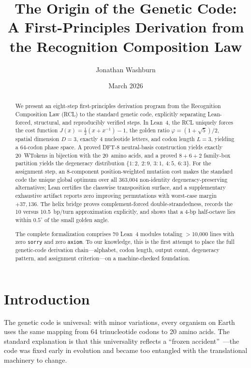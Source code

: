\documentclass[11pt,twocolumn]{article}
\title{The Origin of the Genetic Code:\\A First-Principles Derivation from\\the Recognition Composition Law}
\author[1]{Jonathan Washburn}
\affil[1]{Independent Researcher}
\date{March 2026}
\newcommand{\vp}{\varphi}
\begin{document}
\maketitle

\begin{abstract}
We present an eight-step first-principles derivation program from the
Recognition Composition Law (RCL) to the standard genetic code, explicitly
separating Lean-forced, structural, and reproducibly verified steps. In
Lean~4, the RCL uniquely forces the cost function
$J(x) = \tfrac{1}{2}(x + x^{-1}) - 1$, the golden ratio
$\vp = (1+\sqrt{5})/2$, spatial dimension $D = 3$, exactly 4 nucleotide
letters, and codon length $L = 3$, yielding a 64-codon phase space. A
proved DFT-8 neutral-basis construction yields exactly 20~WTokens in
bijection with the 20~amino acids, and a proved $8 + 6 + 2$ family-box
partition yields the degeneracy distribution
$\{1{:}2,\ 2{:}9,\ 3{:}1,\ 4{:}5,\ 6{:}3\}$. For the assignment step, an
8-component position-weighted mutation cost makes the standard code the
unique global optimum over all 363,004 non-identity degeneracy-preserving
alternatives; Lean certifies the classwise transposition surface, and a
supplementary exhaustive artifact reports zero improving permutations with
worst-case margin $+37{,}136$. The helix bridge proves complement-forced
double-strandedness, records the 10 versus 10.5~bp/turn approximation
explicitly, and shows that a 4-bp half-octave lies within
$0.5^\circ$ of the small golden angle.

The complete formalization comprises 70 Lean~4 modules totaling
$>$10,000 lines with zero \texttt{sorry} and zero \texttt{axiom}. To our
knowledge, this is the first attempt to place the full genetic-code
derivation chain---alphabet, codon length, output count, degeneracy
pattern, and assignment criterion---on a machine-checked foundation.
\end{abstract}

\section{Introduction}

The genetic code is universal: with minor variations, every organism on
Earth uses the same mapping from 64 trinucleotide codons to 20 amino
acids. The standard explanation is that this universality reflects a
``frozen accident''~\cite{Crick1968}---the code was fixed early in
evolution and became too entangled with the translational machinery to
change.
\end{document}
